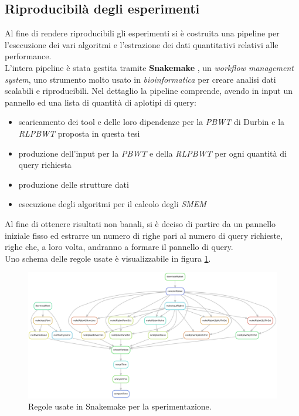 \subsection{Riproducibilà degli esperimenti}
Al fine di rendere riproducibili gli esperimenti si è costruita una pipeline
per l'esecuzione dei vari algoritmi e l'estrazione dei dati quantitativi
relativi alle performance.\\
L'intera pipeline è stata gestita tramite \textbf{Snakemake} \cite{snakemake},
un \textit{workflow management system}, uno strumento molto usato in
\textit{bioinformatica} per creare analisi dati scalabili e riproducibili. Nel
dettaglio la pipeline comprende, avendo in input un pannello ed una lista di
quantità di aplotipi di query:
\begin{itemize}
  \item scaricamento dei tool e delle loro dipendenze per la \textit{PBWT} di
  Durbin e la \textit{RLPBWT} proposta in questa tesi
  \item produzione dell'input per la \textit{PBWT} e della \textit{RLPBWT} per
  ogni quantità di query richiesta
  \item produzione delle strutture dati
  \item esecuzione degli algoritmi per il calcolo degli \textit{SMEM}
\end{itemize}
Al fine di ottenere risultati non banali, si è deciso di partire da
un pannello iniziale fisso ed estrarre un numero di righe pari al numero di
query richieste, righe che, a loro volta, andranno a formare il pannello di
query.\\ 
Uno schema delle regole usate è visualizzabile in figura \ref{fig:snake}.
\begin{figure}
  \centering
  \includegraphics[width=\textwidth]{img/rules.pdf}
  \caption{Regole usate in Snakemake per la sperimentazione.}
  \label{fig:snake}
\end{figure}